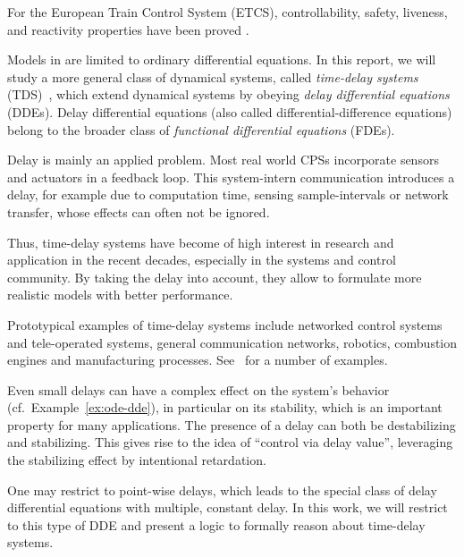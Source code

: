     For the European Train Control System (ETCS), controllability, safety, liveness, and reactivity properties have been proved \cite{Platzer09ETCS}.

    

    Models in \dL are limited to ordinary differential equations.
    In this report, we will study a more general class of dynamical systems, called \emph{time-delay systems} (TDS)~\cite{Richard2003TDSs}, which extend dynamical systems by obeying \emph{delay differential equations} (DDEs). Delay differential equations (also called differential-difference equations) belong to the broader class of \emph{functional differential equations} (FDEs).

    Delay is mainly an applied problem. Most real world CPSs incorporate
    sensors and actuators in a feedback loop. This system-intern communication introduces a delay, for example due to computation time, sensing sample-intervals or network transfer, whose effects can often not be ignored.

    Thus, time-delay systems have become of high interest in research and application in the recent decades, especially in the systems and control community. By taking the delay into account, they allow to formulate more realistic models with better performance.
    
    Prototypical examples of time-delay systems include networked control systems and tele-operated systems, general communication networks, robotics, combustion engines and manufacturing processes. See~\cite{Gu03TimeDelaySys} for a number of examples.

    Even small delays can have a complex effect on the system's behavior (cf.\ Example~\ref{ex:ode-dde}), in particular on its stability, which is an important property for many applications.
    The presence of a delay can both be destabilizing and stabilizing.
    This gives rise to the idea of ``control via delay value'', leveraging the stabilizing effect by intentional retardation.
    


    One may restrict to point-wise delays, which leads to the special class of delay differential equations with multiple, constant delay.
    In this work, we will restrict to this type of DDE and present a logic to formally reason about time-delay systems.

    


    
